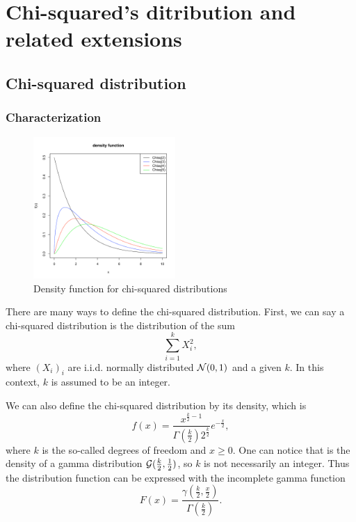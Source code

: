 \chapter{Chi-squared's ditribution and related extensions}
\section{Chi-squared distribution}\label{chisquared}
\subsection{Characterization}
\begin{figure}
  \vspace{-20pt}
  \begin{center}
    \includegraphics[width=0.48\textwidth]{img/chisqzoom}
  \end{center}
  \vspace{-20pt}  
  \caption{Density function for chi-squared distributions}
\end{figure}
There are many ways to define the chi-squared distribution. First, we can say a chi-squared distribution is the distribution of the sum
$$
\sum_{i=1}^k X_i^2,
$$
where $(X_i)_i$ are i.i.d. normally distributed $\mathcal N(0,1)$ and a given $k$. In this context, $k$ is assumed to be an integer.

We can also define the chi-squared distribution by its density, which is
$$
f(x) = \frac{x^{\frac{k}{2}-1}}{\Gamma(\frac{k}{2}) 2^{\frac{k}{2}} }  e^{-\frac{x}{2} },  
$$
where $k$ is the so-called degrees of freedom and $x\geq 0$. One can notice that is the density of a gamma distribution $\mathcal G(\frac{k}{2},\frac{1}{2})$, so $k$ is not necessarily an integer. Thus the distribution function can be expressed with the incomplete gamma function
$$
F(x) = \frac{\gamma(\frac{k}{2},\frac{x}{2})}{\Gamma(\frac{k}{2})}. 
$$


